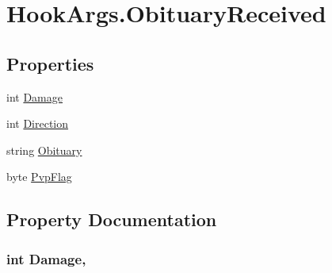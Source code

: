 \hypertarget{structOTA_1_1Plugin_1_1HookArgs_1_1ObituaryReceived}{}\section{Hook\+Args.\+Obituary\+Received}
\label{structOTA_1_1Plugin_1_1HookArgs_1_1ObituaryReceived}
\subsection*{Properties}
\begin{DoxyCompactItemize}
\item 
int \hyperlink{structOTA_1_1Plugin_1_1HookArgs_1_1ObituaryReceived_ab16a3ebb727a38f50223c1be2ecd111d}{Damage}
\item 
int \hyperlink{structOTA_1_1Plugin_1_1HookArgs_1_1ObituaryReceived_a633488975bec9778113562927745d46c}{Direction}
\item 
string \hyperlink{structOTA_1_1Plugin_1_1HookArgs_1_1ObituaryReceived_a984f15b6811029d1850ee945c056d08f}{Obituary}
\item 
byte \hyperlink{structOTA_1_1Plugin_1_1HookArgs_1_1ObituaryReceived_a7081c3650b34ffa2825d8584a0f6c9c8}{Pvp\+Flag}
\end{DoxyCompactItemize}


\subsection{Property Documentation}
\hypertarget{structOTA_1_1Plugin_1_1HookArgs_1_1ObituaryReceived_ab16a3ebb727a38f50223c1be2ecd111d}{}
\subsubsection[{Damage}]{\setlength{\rightskip}{0pt plus 5cm}int Damage\hspace{0.3cm}{\ttfamily [get]}, {\ttfamily [set]}}\label{structOTA_1_1Plugin_1_1HookArgs_1_1ObituaryReceived_ab16a3ebb727a38f50223c1be2ecd111d}
\hypertarget{structOTA_1_1Plugin_1_1HookArgs_1_1ObituaryReceived_a633488975bec9778113562927745d46c}{}
